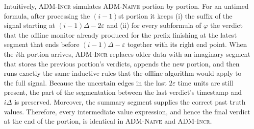 
Intuitively, \textsc{ADM-Incr} simulates \textsc{ADM-Naive} portion by portion.
For an untimed formula, after processing the $(i-1)$st portion it keeps (i) the suffix of the signal starting at $(i-1)\Delta - 2\varepsilon$ and (ii) for every subformula of $\varphi$ the verdict that the offline monitor already produced for the prefix finishing at the latest segment that ends before $(i-1)\Delta - \varepsilon$ together with its right end point.
When the $i$th portion arrives, \textsc{ADM-Incr} replaces older data with an imaginary segment that stores the previous portion's verdicts, appends the new portion, and then runs exactly the same inductive rules that the offline algorithm would apply to the full signal.
Because the uncertain edges in the last $2\varepsilon$ time units are still present, the part of the segmentation between the last verdict's timestamp and $i\Delta$ is preserved.
Moreover, the summary segment supplies the correct past truth values.
Therefore, every intermediate value expression, and hence the final verdict at the end of the portion, is identical in \textsc{ADM-Naive} and \textsc{ADM-Incr}.

